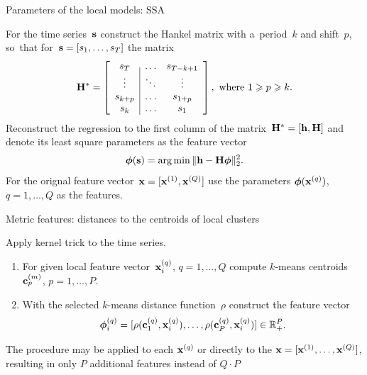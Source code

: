 \documentclass{beamer}
\begin{document}
\begin{frame}{Parameters of the local models: SSA}

For the time series~${\mathbf{s}}$ construct the Hankel matrix with a~period~$k$ and shift~$p$, so~that for~${\mathbf{s}} = [s_1,\dots,s_T]$ the matrix
\[
\mathbf{H}^* =
\left[ \begin{array}{c|cc}
s_T  & \dots & s_{T-k+1} \\
\vdots & \ddots & \vdots \\
s_{k+p} & \dots & s_{1+p}\\
s_k & \dots & s_1 \\
\end{array}
\right],
\text{~where~} 1\geqslant p \geqslant k .
\]
Reconstruct the regression to the first column of the matrix~$\mathbf{H}^*=[{\mathbf{h}}, \mathbf{H}]$ and denote its least square parameters as the feature vector
\[
\boldsymbol{\phi}({\mathbf{s}}) = \arg\min \| {\mathbf{h}}-\mathbf{H} \boldsymbol{\phi}\|_2^2.
\]
For the orignal feature vector~${\mathbf{x}} = [{\mathbf{x}}^{(1)}, {\mathbf{x}}^{(Q)}]$ use the parameters $\boldsymbol{\phi}({\mathbf{x}}^{(q)})$, $q = 1, \dots, Q$ as the features.

\end{frame}
\begin{frame}{Metric features: distances to the centroids of local clusters}

Apply kernel trick to the time series.

\begin{enumerate}
\item For given local feature vector~${\mathbf{x}}_i^{(q)}$, $q=1,\dots, Q$ compute $k$-means centroids~${\mathbf{c}}_p^{(m)}$, $p = 1, \dots, P$.
\item   With the selected $k$-means distance function~$\rho$ construct the feature vector
\[
{\boldsymbol{\phi}}_i^{(q)} = [\rho({\mathbf{c}}_1^{(q)},{\mathbf{x}}_i^{(q)}),\dots,\rho({\mathbf{c}}^{(q)}_P,{\mathbf{x}}_i^{(q)})] \in \mathbb{R}_+^P.
\]
\end{enumerate}

\bigskip

The procedure may be applied to each ${\mathbf{x}}^{(q)}$ or directly to the ${\mathbf{x}} = [{\mathbf{x}}^{(1)}, \dots, {\mathbf{x}}^{(Q)}]$, resulting in only $P$ additional features instead of $Q\cdot{P}$
\end{frame}
\end{document}
